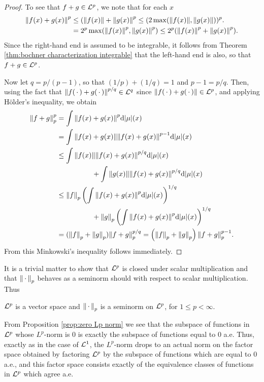 \begin{proof}
To see that $f+g\in{\cal L}^p$, we note that for each $x$
\begin{align*}
\norm{f(x)+g(x)}^p&\leq(\norm{f(x)}+\norm{g(x)}^p\leq(2\max(\norm{f(x)},\norm{g(x)}))^p. \\
&=2^p \max(\norm{f(x)}^p,\norm{g(x)}^p)\leq2^p(\norm{f(x)}^p+\norm{g(x)}^p).
\end{align*}
Since the right-hand end is assumed to be integrable, it follows from Theorem \ref{thm:bochner characterization integrable} that the left-hand end is also, so that $f+g\in{\cal L}^p$.

Now let $q=p/(p-1)$, so that $(1/p)+(1/q)=1$ and $p-1=p/q$. Then, using the fact that $\norm{f(\,\cdot\,)+g(\,\cdot\,)}^{p/q}\in{\cal L}^q$ since $\norm{f(\,\cdot\,)+g(\,\cdot\,)}\in{\cal L}^p$, and applying H\"older's inequality, we obtain
\begin{align*}
    \norm{f+g}_p^p&=\int\norm{f(x)+g(x)}^p\dd|\mu|(x)\\
    &=\int\norm{f(x)+g(x)}\norm{f(x)+g(x)}^{p-1}\dd|\mu|(x)\\
    &\leq\int\norm{f(x)}\norm{f(x)+g(x)}^{p/q}\dd|\mu|(x)\\
    &\quad\quad\quad\quad\quad+\int\norm{g(x)}\norm{f(x)+g(x)}^{p/q}\dd|\mu|(x)\\
    &\leq\norm{f}_p\left(\int\norm{f(x)+g(x)}^p\dd|\mu|(x)\right)^{1/q}\\
    &\quad\quad\quad\quad\quad+\norm{g}_p\left(\int\norm{f(x)+g(x)}^p\dd|\mu|(x)\right)^{1/q}\\
    &=(\norm{f}_p+\norm{g}_p)\norm{f+g}_p^{p/q}=\left(\norm{f}_p+\norm{g}_p\right)\norm{f+g}_p^{p-1}.
\end{align*} From this Minkowski's inequality follows immediately.
\end{proof}

It is a trivial matter to show that ${\cal L}^p$ is closed under scalar multiplication and that $\norm{\,\cdot\,}_p$ behaves as a seminorm should with respect to scalar multiplication. Thus

\begin{corollary}
${\cal L}^p$ is a vector space and $\norm{\,\cdot\,}_p$ is a seminorm on ${\cal L}^p$, for $1\leq p<\infty$.
\end{corollary}

From Proposition \ref{prop:zero Lp norm} we see that the subspace of functions in ${\cal L}^p$ whose $L^p$-norm is 0 is exactly the subspace of functions equal to 0 a.e. Thus, exactly as in the case of ${\cal L}^1$, the $L^p$-norm drops to an actual norm on the factor space obtained by factoring ${\cal L}^p$ by the subspace of functions which are equal to 0 a.e., and this factor space consists exactly of the equivalence classes of functions in ${\cal L}^p$ which agree a.e.


